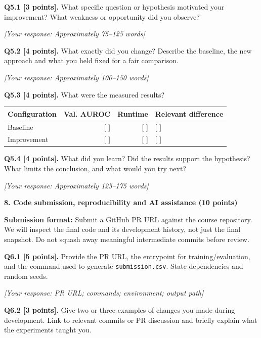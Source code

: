 \documentclass[11pt,letterpaper]{article}
\begin{document}
\vspace{6pt}
\textbf{Q5.1 [3 points].} What specific question or hypothesis motivated your improvement? What weakness or opportunity did you observe?

\textit{[Your response: Approximately 75--125 words]}

\vspace{6pt}
\textbf{Q5.2 [4 points].} What exactly did you change? Describe the baseline, the new approach and what you held fixed for a fair comparison.

\textit{[Your response: Approximately 100--150 words]}

\vspace{6pt}
\textbf{Q5.3 [4 points].} What were the measured results?

\vspace{2pt}
\begin{tabularx}{\textwidth}{@{}lrrX@{}}
\toprule
\textbf{Configuration} & \textbf{Val. AUROC} & \textbf{Runtime} & \textbf{Relevant difference} \\
\midrule
Baseline & [ ] & [ ] & [ ] \\
Improvement & [ ] & [ ] & [ ] \\
\bottomrule
\end{tabularx}

\vspace{6pt}
\textbf{Q5.4 [4 points].} What did you learn? Did the results support the hypothesis? What limits the conclusion, and what would you try next?

\textit{[Your response: Approximately 125--175 words]}

\vspace{12pt}
{\large\textbf{8. Code submission, reproducibility and AI assistance (10 points)}}
\vspace{2pt}

\textbf{Submission format:} Submit a GitHub PR URL against the course repository. We will inspect the final code and its development history, not just the final snapshot. Do not squash away meaningful intermediate commits before review.

\vspace{6pt}
\textbf{Q6.1 [5 points].} Provide the PR URL, the entrypoint for training/evaluation, and the command used to generate \texttt{submission.csv}. State dependencies and random seeds.

\textit{[Your response: PR URL; commands; environment; output path]}

\vspace{6pt}
\textbf{Q6.2 [3 points].} Give two or three examples of changes you made during development. Link to relevant commits or PR discussion and briefly explain what the experiments taught you.
\end{document}
